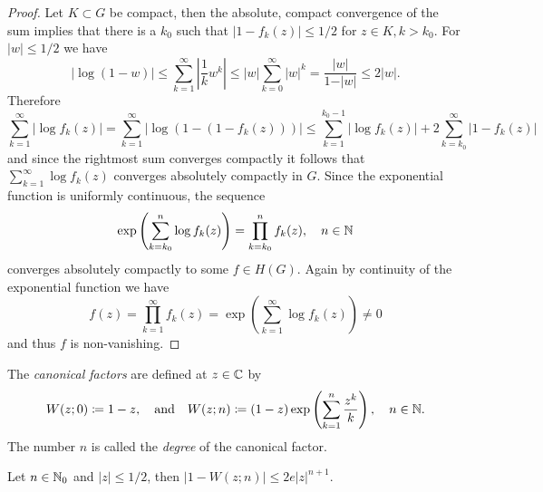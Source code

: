 \begin{proof}
    Let $K \subset G$ be compact, then the absolute, compact convergence of the sum implies that there is a $k_0$ such that $\vert 1 - f_k(z) \vert \leq 1/2$ for $z \in K, k > k_0$. For $\vert w \vert \leq 1/2$ we have
    \begin{equation*}
        \vert \log(1 - w) \vert \leq \sum_{k=1}^\infty \left\vert \frac{1}{k} w^k \right\vert \leq \vert w \vert \sum_{k=0}^\infty \vert w \vert^k = \frac{\vert w \vert}{1 - \vert w \vert} \leq 2 \vert w \vert.
    \end{equation*}
    Therefore
    \begin{equation*}
        \sum_{k=1}^\infty \vert \log f_k(z) \vert = \sum_{k=1}^\infty \vert \log (1 - (1 - f_k(z))) \vert \leq \sum_{k=1}^{k_0 - 1} \vert \log f_k(z) \vert + 2 \sum_{k=k_0}^\infty \vert 1 - f_k(z) \vert
    \end{equation*}
    and since the rightmost sum converges compactly it follows that $\sum_{k=1}^\infty \log f_k(z)$ converges absolutely compactly in $G$. Since the exponential function is uniformly continuous, the sequence
    $$ \exp \left( \sum_{k=k_0}^n \log f_k(z) \right) = \prod_{k=k_0}^n f_k(z), \quad n \in \mathbb{N} $$
    converges absolutely compactly to some $f \in H(G)$. Again by continuity of the exponential function we have
    $$ f(z) = \prod_{k=1}^\infty f_k(z) = \exp \left( \sum_{k=1}^\infty \log f_k(z) \right) \neq 0 $$
    and thus $f$ is non-vanishing.
\end{proof}

\begin{definition} \label{def:canonical-factors}
    The \emph{canonical factors} are defined at $z \in \mathbb{C}$ by
    $$ W(z; 0) \coloneqq 1-z, \quad \textrm{and} \quad W(z; n) \coloneqq (1-z) \exp \left( \sum_{k=1}^n \frac{z^k}{k} \right), \quad n \in \mathbb{N}. $$
    The number $n$ is called the \emph{degree} of the canonical factor.
\end{definition}

\begin{lemma} \label{lem:estimate-canonical-factors}
    Let $n \in \mathbb{N}_0$ and $\vert z \vert \leq 1/2$, then $ \vert 1 - W(z; n) \vert \leq 2e \vert z \vert^{n+1} $.
\end{lemma}


